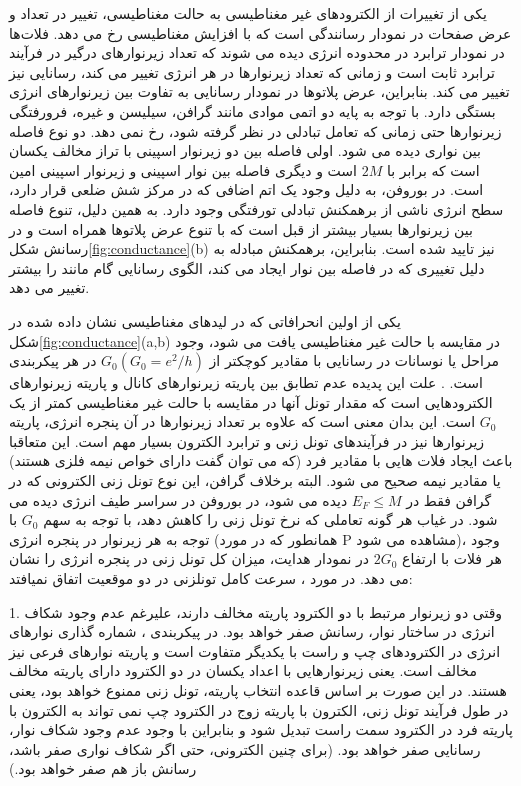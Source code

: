 یکی از تغییرات از الکترودهای غیر مغناطیسی به حالت مغناطیسی، تغییر در تعداد و عرض صفحات در نمودار رسانندگی است که با افزایش مغناطیسی رخ می دهد. فلات‌ها در نمودار ترابرد در محدوده انرژی دیده می شوند که تعداد زیر‌نوارهای درگیر در فرآیند ترابرد ثابت است و زمانی که تعداد زیر‌نوارها در هر انرژی تغییر می کند، رسانایی نیز تغییر می کند. بنابراین، عرض پلاتوها در نمودار رسانایی به تفاوت بین زیر‌نوارهای انرژی بستگی دارد. با توجه به پایه دو اتمی موادی مانند گرافن، سیلیسن و غیره، فرورفتگی زیر‌نوارها حتی زمانی که تعامل تبادلی در نظر گرفته شود، رخ نمی دهد. دو نوع فاصله بین نواری دیده می شود. اولی فاصله بین دو زیر‌نوار اسپینی با تراز مخالف یکسان است که برابر با $2M$ است و دیگری فاصله بین نوار اسپینی  و زیر‌نوار اسپینی امین است. در بوروفن، به دلیل وجود یک اتم اضافی که در مرکز شش ضلعی قرار دارد، سطح انرژی ناشی از برهمکنش تبادلی تورفتگی وجود دارد. به همین دلیل، تنوع فاصله بین زیر‌نوارها بسیار بیشتر از قبل است که با تنوع عرض پلاتوها همراه است و در رسانش شکل\ref{fig:conductance}(b) نیز تایید شده است. بنابراین، برهمکنش مبادله به دلیل تغییری که در فاصله بین نوار ایجاد می کند، الگوی رسانایی گام مانند را بیشتر تغییر می دهد. 

یکی از اولین انحرافاتی که در لیدهای مغناطیسی نشان داده شده در شکل\ref{fig:conductance}(a,b) در مقایسه با حالت غیر مغناطیسی یافت می شود، وجود مراحل یا نوسانات در رسانایی با مقادیر کوچکتر از $G_0 (G_0 = e^2/h)$ در هر پیکربندی است. . علت این پدیده عدم تطابق بین پاریته زیر‌نوارهای کانال و پاریته زیر‌نوارهای الکترودهایی است که مقدار تونل آنها در مقایسه با حالت غیر مغناطیسی کمتر از یک $G_0$ است. این بدان معنی است که علاوه بر تعداد زیر‌نوارها در آن پنجره انرژی، پاریته زیر‌نوارها نیز در فرآیندهای تونل زنی و ترابرد الکترون بسیار مهم است. این متعاقبا باعث ایجاد فلات هایی با مقادیر فرد (که می توان گفت دارای خواص نیمه فلزی هستند) یا مقادیر نیمه صحیح می شود. البته برخلاف گرافن، این نوع تونل زنی الکترونی که در گرافن فقط در $E_F\le M$ دیده می شود، در بوروفن در سراسر طیف انرژی دیده می شود.
در غیاب هر گونه تعاملی که نرخ تونل زنی را کاهش دهد، با توجه به سهم  $G_0$ با توجه به هر زیر‌نوار در پنجره انرژی (همانطور که در مورد P مشاهده می شود)، وجود هر فلات با ارتفاع $2G_0$ در نمودار هدایت، میزان کل تونل زنی در پنجره انرژی را نشان می دهد. در مورد ، سرعت کامل تونلزنی در دو موقعیت اتفاق نمیافتد:

1. وقتی دو زیر‌نوار مرتبط با دو الکترود پاریته مخالف دارند، علیرغم عدم وجود شکاف انرژی در ساختار نوار، رسانش صفر خواهد بود. در پیکربندی ، شماره گذاری نوارهای انرژی در الکترودهای چپ و راست با یکدیگر متفاوت است و پاریته نوارهای فرعی نیز مخالف است. یعنی زیر‌نوارهایی با اعداد یکسان در دو الکترود دارای پاریته مخالف هستند. در این صورت بر اساس قاعده انتخاب پاریته، تونل زنی ممنوع خواهد بود، یعنی در طول فرآیند تونل زنی، الکترون با پاریته زوج در الکترود چپ نمی تواند به الکترون با پاریته فرد در الکترود سمت راست تبدیل شود و بنابراین با وجود عدم وجود شکاف نوار، رسانایی صفر خواهد بود. (برای چنین الکترونی، حتی اگر شکاف نواری صفر باشد، رسانش باز هم صفر خواهد بود.) 

